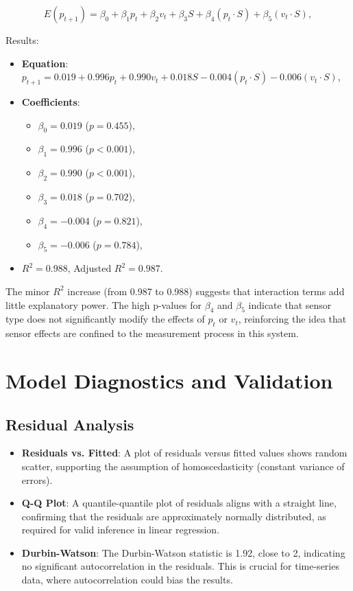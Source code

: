 \documentclass[12pt]{article}
\begin{document}
\begin{equation}
    E(p_{t+1}) = \beta_0 + \beta_1 p_t + \beta_2 v_t + \beta_3 S + \beta_4 (p_t \cdot S) + \beta_5 (v_t \cdot S),
    \label{eq:interaction_model}
\end{equation}

Results:
\begin{itemize}
    \item \textbf{Equation}: \( p_{t+1} = 0.019 + 0.996 p_t + 0.990 v_t + 0.018 S - 0.004 (p_t \cdot S) - 0.006 (v_t \cdot S) \),
    \item \textbf{Coefficients}:
    \begin{itemize}
        \item \( \beta_0 = 0.019 \) (\( p = 0.455 \)),
        \item \( \beta_1 = 0.996 \) (\( p < 0.001 \)),
        \item \( \beta_2 = 0.990 \) (\( p < 0.001 \)),
        \item \( \beta_3 = 0.018 \) (\( p = 0.702 \)),
        \item \( \beta_4 = -0.004 \) (\( p = 0.821 \)),
        \item \( \beta_5 = -0.006 \) (\( p = 0.784 \)),
    \end{itemize}
    \item \( R^2 = 0.988 \), Adjusted \( R^2 = 0.987 \).
\end{itemize}

The minor \( R^2 \) increase (from 0.987 to 0.988) suggests that interaction terms add little explanatory power. The high p-values for \( \beta_4 \) and \( \beta_5 \) indicate that sensor type does not significantly modify the effects of \( p_t \) or \( v_t \), reinforcing the idea that sensor effects are confined to the measurement process in this system.

\section{Model Diagnostics and Validation}
\label{sec:diagnostics}

\subsection{Residual Analysis}
\label{subsec:residual_analysis}

\begin{itemize}
    \item \textbf{Residuals vs. Fitted}: A plot of residuals versus fitted values shows random scatter, supporting the assumption of homoscedasticity (constant variance of errors).
    \item \textbf{Q-Q Plot}: A quantile-quantile plot of residuals aligns with a straight line, confirming that the residuals are approximately normally distributed, as required for valid inference in linear regression.
    \item \textbf{Durbin-Watson}: The Durbin-Watson statistic is 1.92, close to 2, indicating no significant autocorrelation in the residuals. This is crucial for time-series data, where autocorrelation could bias the results.
\end{itemize}
\end{document}
